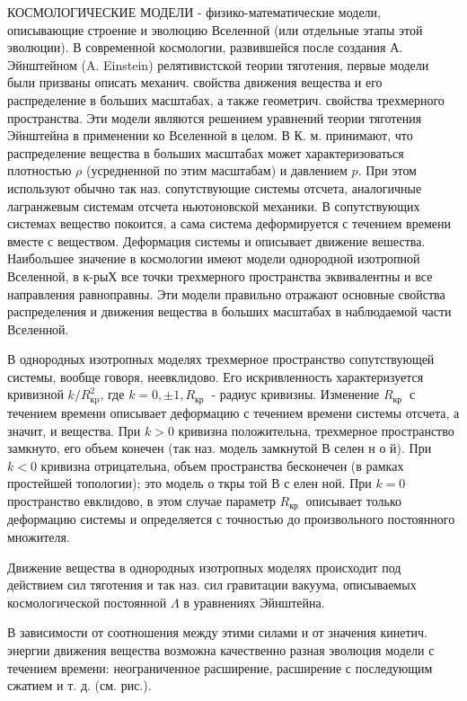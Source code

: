 \documentclass[10pt]{article}
\begin{document}
КОСМОЛОГИЧЕСКИЕ МОДЕЛИ - физико-математические модели, описывающие строение и эволюцию Вселенной (или отдельные этапы этой эволюции). В современной космологии, развившейся после создания А. Эйнштейном (A. Einstein) релятивистской теории тяготения, первые модели были призваны описать механич. свойства движения вещества и его распределение в больших масштабах, а также геометрич. свойства трехмерного пространства. Эти модели являются решением уравнений теории тяготения Эйнштейна в применении ко Вселенной в целом. В К. м. принимают, что распределение вещества в больших масштабах может характеризоваться плотностью $\rho$ (усредненной по этим масштабам) и давлением $p$. При этом используют обычно так наз. сопутствующие системы отсчета, аналогичные лагранжевым системам отсчета ньютоновской механики. В сопутствующих системах вещество покоится, а сама система деформируется с течением времени вместе с веществом. Деформация системы и описывает движение вешества. Наибольшее значение в космологии имеют модели однородной изотропной Вселенной, в к-рыХ все точки трехмерного пространства эквивалентны и все направления равноправны. Эти модели правильно отражают основные свойства распределения и движения вещества в больших масштабах в наблюдаемой части Вселенной.



В однородных изотропных моделях трехмерное пространство сопутствующей системы, вообще говоря, неевклидово. Его искривленность характеризуется кривизной $k / R_{\mathrm{кp}}^{2}$, где $k=0, \pm 1, R_{\text {кр }}$ - радиус кривизны. Изменение $R_{\text {кр }}$ с течением времени описывает деформацию с течением времени системы отсчета, а значит, и вещества. При $k>0$ кривизна положительна, трехмерное пространство замкнуто, его объем конечен (так наз. модель замкнутой В селен н о й). При $k<0$ кривизна отрицательна, объем пространства бесконечен (в рамках простейшей топологии); это модель о ткры той В с елен ной. При $k=0$ пространство евклидово, в этом случае параметр $R_{\text {кр }}$ описывает только деформацию системы и определяется с точностью до произвольного постоянного множителя.



Движение вещества в однородных изотропных моделях происходит под действием сил тяготения и так наз. сил гравитации вакуума, описываемых космологической постоянной $\Lambda$ в уравнениях Эйнштейна.



В зависимости от соотношения между этими силами и от значения кинетич. энергии движения вещества возможна качественно разная эволюция модели с течением времени: неограниченное расширение, расширение с последующим сжатием и т. д. (см. рис.).
\end{document}
